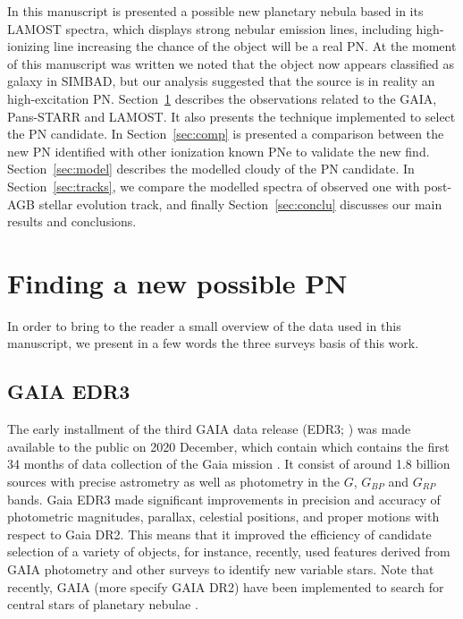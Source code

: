 \documentclass[fleqn,usenatbib]{mnras}
\begin{document}
In this manuscript is presented a possible new planetary nebula based in
its LAMOST spectra, which displays strong nebular emission lines, including high-ionizing
line increasing the chance of the object will be a real PN.
At the moment of this manuscript was written we noted that the
object now appears classified as galaxy in SIMBAD, but our analysis
suggested that the source is in reality an high-excitation PN. 
Section~\ref{sec:metho} describes the observations related to the GAIA,
Pans-STARR and LAMOST. It also presents the technique implemented 
to select the PN candidate. In Section~\ref{sec:comp} is presented
a comparison between the new PN identified with other ionization known PNe
to validate the new find. Section~\ref{sec:model} describes the modelled {\sc cloudy}
of the PN candidate. In Section~\ref{sec:tracks}, we compare the modelled spectra of
observed one with post-AGB stellar evolution track, and finally
Section~\ref{sec:conclu} discusses our main results and conclusions.

\section{Finding a new possible PN}
\label{sec:metho}

In order to bring to the reader a small overview of the data used
in this manuscript, we present in a few words the three
surveys basis of this work.

\subsection{GAIA EDR3}
\label{sec:gaia}

The early installment of the third GAIA data release (EDR3; \citealp{Brown:2021})
was made available to the public on 2020 December, which contain which contains
the first 34 months of data collection of the Gaia mission \citep{Brown:2018}.
It consist of around 1.8 billion sources with precise astrometry as well as
photometry in the $G$, $G_{BP}$ and $G_{RP}$ bands. Gaia EDR3 made
significant improvements in precision and accuracy of
photometric magnitudes, parallax, celestial positions, and proper
motions with respect to Gaia DR2. This means that it improved
the efficiency of candidate selection of a variety of
objects, for instance, recently,  \citet{Christy:2023} used features
derived from GAIA photometry and other surveys to identify new variable stars.
Note that recently, GAIA (more specify GAIA DR2) have been implemented
to search for central stars of planetary nebulae \citep{Chornay:2020}.
\end{document}
